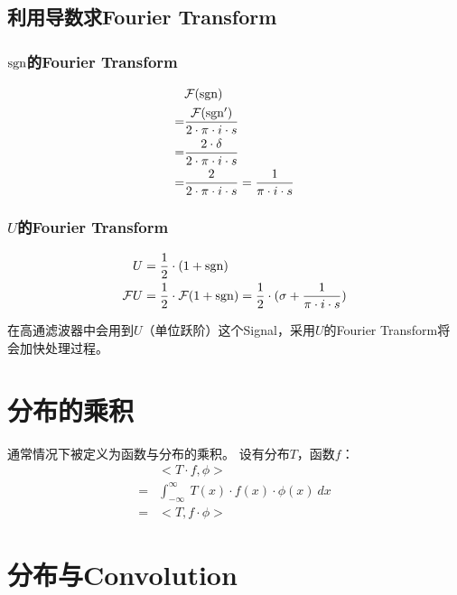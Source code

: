 \subsection{利用导数求Fourier Transform}
\subsubsection {$\operatorname{sgn}$的Fourier Transform}
\begin{align*}
	  & \mathcal{F}(\operatorname{sgn})                                             \\
	= & \frac{\mathcal{F}(\operatorname{sgn}')}{2\cdot\pi\cdot i\cdot s}            \\
	= & \frac{2\cdot \delta}{2\cdot\pi\cdot i\cdot s}                 \\
	= & \frac{2}{2\cdot\pi\cdot i\cdot s}=\frac{1}{\pi\cdot i\cdot s} \\
\end{align*}
\subsubsection {$U$的Fourier Transform}
\begin{align*}
	U            & =\frac{1}{2}\cdot(1+\operatorname{sgn})                                                                  \\
	\mathcal{F}U & =\frac{1}{2}\cdot \mathcal{F}(1+\operatorname{sgn})=\frac{1}{2}\cdot(\sigma+\frac{1}{\pi\cdot i\cdot s})
\end{align*}

在高通滤波器中会用到$U$（单位跃阶）这个Signal，采用$U$的Fourier Transform将会加快处理过程。




\section{分布的乘积}
通常情况下被定义为函数与分布的乘积。
设有分布$T$，函数$f$：
\begin{align*}
	  & <T\cdot f,\phi>                                          \\
	= & \int_{-\infty}^{\infty}\ T(x)\cdot f(x)\cdot \phi(x)\ dx \\
	= & <T,f\cdot \phi>
\end{align*}
\section{分布与Convolution}
